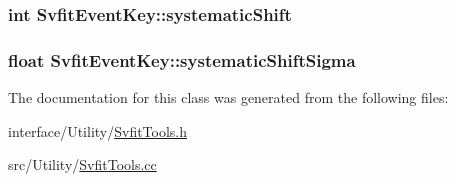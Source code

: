 \label{classSvfitEventKey_afaa8e9d1f49d1717f6498c17a5b6a37a}
\hypertarget{classSvfitEventKey_aadc4624e556a70b6c095ac5373f8bbc8}{
\subsubsection[{systematicShift}]{\setlength{\rightskip}{0pt plus 5cm}int {\bf SvfitEventKey::systematicShift}}}
\label{classSvfitEventKey_aadc4624e556a70b6c095ac5373f8bbc8}
\hypertarget{classSvfitEventKey_a1e9c9f821950ae0d027d21a8ebd67f46}{
\subsubsection[{systematicShiftSigma}]{\setlength{\rightskip}{0pt plus 5cm}float {\bf SvfitEventKey::systematicShiftSigma}}}
\label{classSvfitEventKey_a1e9c9f821950ae0d027d21a8ebd67f46}


The documentation for this class was generated from the following files:\begin{DoxyCompactItemize}
\item 
interface/Utility/\hyperlink{SvfitTools_8h}{SvfitTools.h}\item 
src/Utility/\hyperlink{SvfitTools_8cc}{SvfitTools.cc}\end{DoxyCompactItemize}
